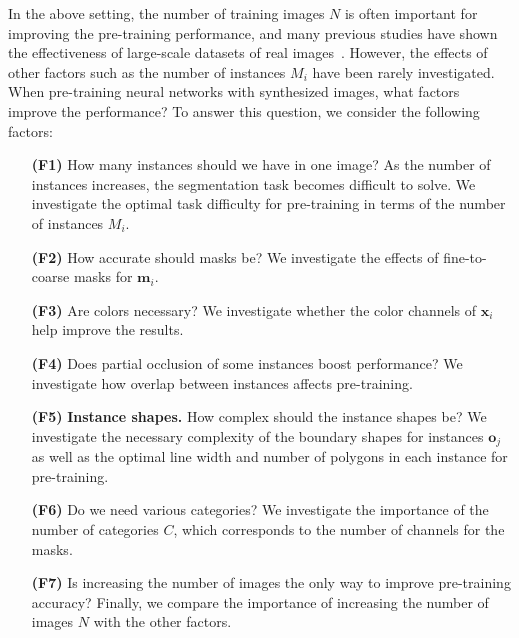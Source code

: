 \documentclass[10pt,twocolumn,letterpaper]{article}
\begin{document}
\figB
\figC

In the above setting, the number of training images $N$ is often important for improving the pre-training performance, and many previous studies have shown the effectiveness of large-scale datasets of real images~\cite{https://doi.org/10.48550/arxiv.1405.0312}.
However, the effects of other factors such as the number of instances $M_{i}$ have been rarely investigated.
When pre-training neural networks with synthesized images, what factors improve the performance?
To answer this question, we consider the following factors:
{
\setlength{\leftmargini}{22pt}
\begin{enumerate}
\setlength{\itemsep}{0pt}
\setlength{\parskip}{0pt}
\setlength{\itemindent}{0pt}
\setlength{\labelsep}{3pt}

\item[\bf (F1)]
How many instances should we have in one image? As the number of instances increases, the segmentation task becomes difficult to solve. We investigate the optimal task difficulty for pre-training in terms of the number of instances $M_{i}$.

\item[\bf (F2)]
How accurate should masks be? We investigate the effects of fine-to-coarse masks for $\bm{m}_{i}$.

\item[\bf (F3)]
Are colors necessary? We investigate whether the color channels of $\bm{x}_{i}$ help improve the results.


\item[\bf (F4)] 
Does partial occlusion of some instances boost performance?
We investigate how overlap between instances affects pre-training.

\item[{\bf (F5)}]{\bf Instance shapes.}
How complex should the instance shapes be?
We investigate the necessary complexity of the boundary shapes for instances $\bm{o}_{j}$
as well as the optimal line width and number of polygons in each instance for pre-training.

\item[\bf (F6)]
Do we need various categories? We investigate the importance of the number of categories $C$, which corresponds to the number of channels for the masks.

\item[\bf (F7)]
Is increasing the number of images the only way to improve pre-training accuracy?
Finally, we compare the importance of increasing the number of images $N$ with the other factors.
\end{enumerate}
}
\end{document}
